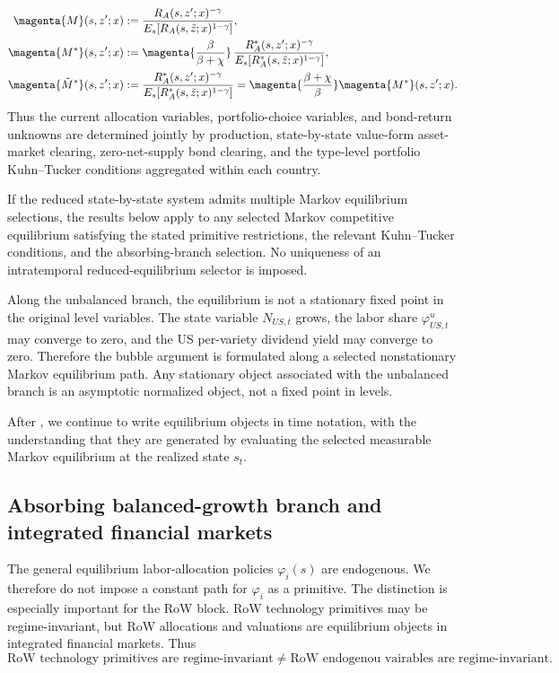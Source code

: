 \documentclass{article}
\def\green#1{#1}%
\begin{document}
\begin{align*}
\magenta{M}(s,z';x)
&:=
\frac{R_A(s,z';x)^{-\gamma}}
{E_s\!\left[R_A(s,\tilde z;x)^{1-\gamma}\right]},\\
\magenta{M^*}(s,z';x)
&:=
\magenta{\frac{\beta}{\beta+\chi}}\,
\frac{R_A^*(s,z';x)^{-\gamma}}
{E_s\!\left[R_A^*(s,\tilde z;x)^{1-\gamma}\right]},\\
\magenta{\tilde M^*}(s,z';x)
&:=
\frac{R_A^*(s,z';x)^{-\gamma}}
{E_s\!\left[R_A^*(s,\tilde z;x)^{1-\gamma}\right]}
=\magenta{\frac{\beta+\chi}{\beta}}\magenta{M^*}(s,z';x).
\end{align*}
Thus the current allocation variables, portfolio-choice variables, and bond-return unknowns are determined jointly by production, state-by-state value-form asset-market clearing, zero-net-supply bond clearing, and the type-level portfolio \green{Kuhn--Tucker} conditions aggregated within each country.

If the reduced state-by-state system admits multiple Markov equilibrium selections, the results below apply to any selected Markov competitive equilibrium satisfying the stated primitive restrictions, \green{the relevant Kuhn--Tucker conditions}, \green{and the} absorbing-branch selection. No uniqueness of an intratemporal reduced-equilibrium selector is imposed.

Along the unbalanced branch, the equilibrium is not a stationary fixed point in the original level variables. The state variable $N_{US,t}$ grows, the labor share $\varphi_{US,t}^u$ may converge to zero, and the US per-variety dividend yield may converge to zero. Therefore the bubble argument is formulated along a selected nonstationary Markov equilibrium path. Any stationary object associated with the unbalanced branch is an asymptotic normalized object, not a fixed point in levels.

After , we continue to write equilibrium objects in time notation, with the understanding that they are generated by evaluating the selected measurable Markov equilibrium at the realized state $s_t$.


\subsection{Absorbing balanced-growth branch and integrated financial markets}

The general equilibrium labor-allocation policies $\varphi_i(s)$ are endogenous. We therefore do not impose a constant path for $\varphi_i$ as a primitive. The distinction is especially important for the RoW block. RoW technology primitives may be regime-invariant, but RoW allocations and valuations are equilibrium objects in integrated financial markets. Thus
\[
\text{RoW technology primitives are regime-invariant} 
\neq
\text{RoW endogenou vairables are regime-invariant}.
\]
\end{document}
